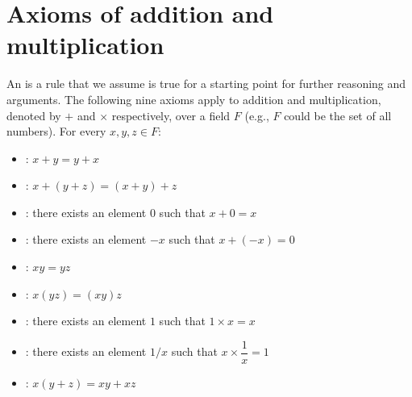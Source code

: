 \documentclass[letterpaper,10pt,english]{jupyterBook}
\begin{document}
\section{Axioms of addition and multiplication}
\label{\detokenize{_pages/0.3_Mathematical_preliminaries:axioms-of-addition-and-multiplication}}
\sphinxAtStartPar
An  is a rule that we assume is true for a starting point for further reasoning and arguments. The following nine axioms apply to addition and multiplication, denoted by \(+\) and \(\times\) respectively, over a field \(F\) (e.g., \(F\) could be the set of all numbers). For every \(x,y,z \in F\):
\begin{itemize}
\item {} 
\sphinxAtStartPar
{}: \(x + y = y + x\)

\item {} 
\sphinxAtStartPar
{}: \(x + (y + z) = (x + y) + z\)

\item {} 
\sphinxAtStartPar
{}: there exists an element \(0\) such that \(x + 0 = x\)

\item {} 
\sphinxAtStartPar
{}: there exists an element \(-x\) such that \(x + (-x) = 0\)

\item {} 
\sphinxAtStartPar
{}: \(xy = yz\)

\item {} 
\sphinxAtStartPar
{}: \(x(yz) = (xy)z\)

\item {} 
\sphinxAtStartPar
{}: there exists an element \(1\) such that \(1 \times x = x\)

\item {} 
\sphinxAtStartPar
{}: there exists an element \(1/x\) such that \(x \times \dfrac{1}{x} = 1\)

\item {} 
\sphinxAtStartPar
{}: \(x(y + z) = xy + xz\)

\end{itemize}
\label{\detokenize{_pages/0.3_Mathematical_preliminaries:imaginary-numbers-section}}
\end{document}
